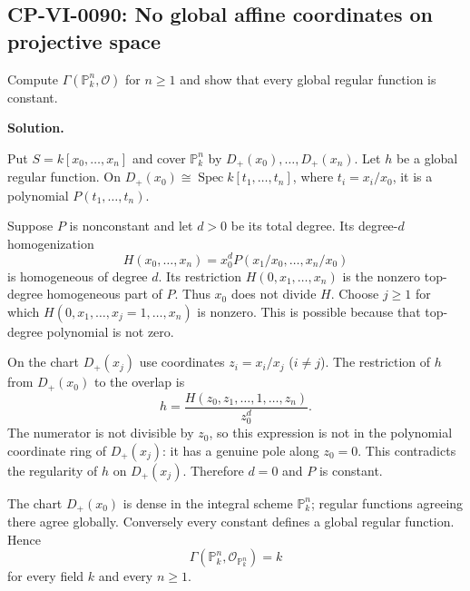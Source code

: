 
\subsection*{CP-VI-0090: No global affine coordinates on projective space}

Compute $\Gamma(\mathbb P_k^n,\mathcal O)$ for $n\ge1$ and show that every global regular function is constant.

\medskip
\noindent\textbf{Solution.}

Put $S=k[x_0,\ldots,x_n]$ and cover $\mathbb P_k^n$ by
$D_+(x_0),\ldots,D_+(x_n)$. Let $h$ be a global regular function. On
$D_+(x_0)\cong\operatorname{Spec}k[t_1,\ldots,t_n]$, where
$t_i=x_i/x_0$, it is a polynomial $P(t_1,\ldots,t_n)$.

Suppose $P$ is nonconstant and let $d>0$ be its total degree. Its
degree-$d$ homogenization
\[
H(x_0,\ldots,x_n)=x_0^d P(x_1/x_0,\ldots,x_n/x_0)
\]
is homogeneous of degree $d$. Its restriction $H(0,x_1,\ldots,x_n)$
is the nonzero top-degree homogeneous part of $P$. Thus $x_0$ does
not divide $H$. Choose $j\geq1$ for which
$H(0,x_1,\ldots,x_j=1,\ldots,x_n)$ is nonzero. This is possible
because that top-degree polynomial is not zero.

On the chart $D_+(x_j)$ use coordinates $z_i=x_i/x_j$ ($i\ne j$).
The restriction of $h$ from $D_+(x_0)$ to the overlap is
\[
h=\frac{H(z_0,z_1,\ldots,1,\ldots,z_n)}{z_0^d}.
\]
The numerator is not divisible by $z_0$, so this expression is not
in the polynomial coordinate ring of $D_+(x_j)$: it has a genuine
pole along $z_0=0$. This contradicts the regularity of $h$ on
$D_+(x_j)$. Therefore $d=0$ and $P$ is constant.

The chart $D_+(x_0)$ is dense in the integral scheme $\mathbb P_k^n$;
regular functions agreeing there agree globally. Conversely every
constant defines a global regular function. Hence
\[
\boxed{\Gamma(\mathbb P_k^n,\mathcal O_{\mathbb P_k^n})=k}
\]
for every field $k$ and every $n\geq1$.
